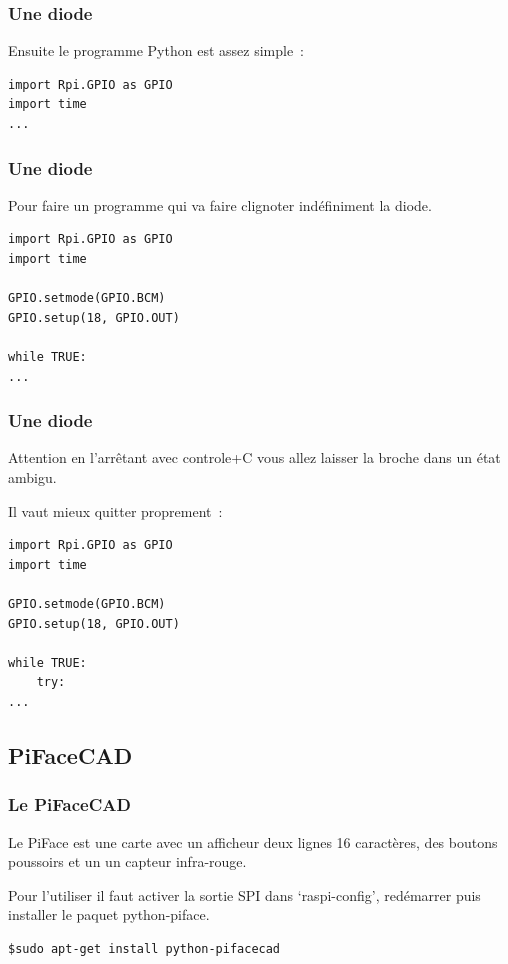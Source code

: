 \begin{frame}[containsverbatim]
\frametitle{Une diode}

Ensuite le programme Python est assez simple~:
\begin{verbatim}
import Rpi.GPIO as GPIO
import time
...
\end{verbatim}

\end{frame}

\begin{frame}[containsverbatim]
\frametitle{Une diode}

Pour faire un programme qui va faire clignoter indéfiniment la diode.

\begin{verbatim}
import Rpi.GPIO as GPIO
import time

GPIO.setmode(GPIO.BCM)
GPIO.setup(18, GPIO.OUT)

while TRUE:
...
\end{verbatim} 

\end{frame}

\begin{frame}[containsverbatim]
\frametitle{Une diode}

Attention en l'arrêtant avec controle+C vous allez laisser la broche dans un état ambigu.

Il vaut mieux quitter proprement~:

\begin{verbatim}
import Rpi.GPIO as GPIO
import time

GPIO.setmode(GPIO.BCM)
GPIO.setup(18, GPIO.OUT)

while TRUE:
    try:
...
\end{verbatim}

\end{frame}

 \subsection{PiFaceCAD}

 \begin{frame}[containsverbatim]
\frametitle{Le PiFaceCAD}
 
 Le PiFace est une carte avec un afficheur deux lignes 16 caractères, des boutons poussoirs et un un capteur infra-rouge.
 
Pour l'utiliser il faut activer la sortie SPI dans `raspi-config', redémarrer puis installer le paquet python-piface.

\begin{verbatim}
$sudo apt-get install python-pifacecad
\end{verbatim}
 
 \end{frame}
 
